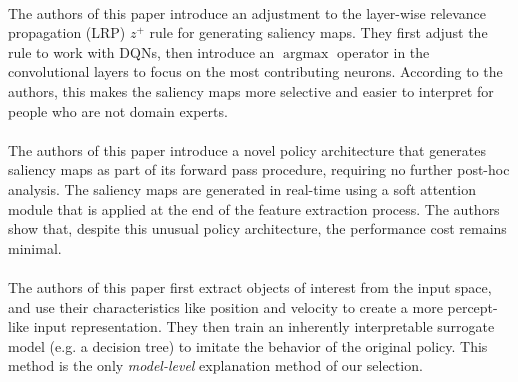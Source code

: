 \documentclass[sigconf]{acmart}
\DeclareMathOperator*{\argmax}{argmax}
\begin{document}
\paragraph{\cite{Huber2019}} The authors of this paper introduce an adjustment to the layer-wise relevance propagation (LRP) $z^+$ rule\cite{bach2015pixel} for generating saliency maps.
They first adjust the rule to work with DQNs, then introduce an $\argmax$ operator in the convolutional layers to focus on the most contributing neurons.
According to the authors, this makes the saliency maps more selective and easier to interpret for people who are not domain experts.

\paragraph{\cite{Nikulin2019}} The authors of this paper introduce a novel policy architecture that generates saliency maps as part of its forward pass procedure, requiring no further post-hoc analysis.
The saliency maps are generated in real-time using a soft attention module that is applied at the end of the feature extraction process.
The authors show that, despite this unusual policy architecture, the performance cost remains minimal.

\paragraph{\cite{Sieusahai2021}} The authors of this paper first extract objects of interest from the input space, and use their characteristics like position and velocity to create a more percept-like input representation.
They then train an inherently interpretable surrogate model (e.g. a decision tree) to imitate the behavior of the original policy.
This method is the only \textit{model-level} explanation method of our selection.
\end{document}
